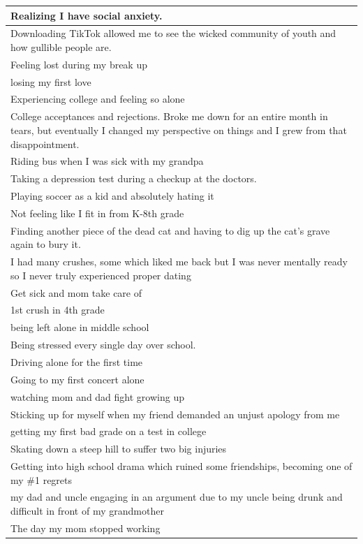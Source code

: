 \documentclass[
  .7em,
  letterpaper,
  DIV=11,
  numbers=noendperiod]{scrartcl}
\begin{document}
\begin{table}
\begin{tabular}{l}
\hline
Realizing I have social anxiety.\\
\hline
Downloading TikTok allowed me to see the wicked community of youth and how gullible people are.\\
\hline
Feeling lost during my break up\\
\hline
losing my first love\\
\hline
Experiencing college and feeling so alone\\
\hline
College acceptances and rejections. Broke me down for an entire month in tears, but eventually I changed my perspective on things and I grew from that disappointment.\\
\hline
Riding bus when I was sick with my grandpa\\
\hline
Taking a depression test during a checkup at the doctors.\\
\hline
Playing soccer as a kid and absolutely hating it\\
\hline
Not feeling like I fit in from K-8th grade\\
\hline
Finding another piece of the dead cat and having to dig up the cat's grave again to bury it.\\
\hline
I had many crushes, some which liked me back but I was never mentally ready so I never truly experienced proper dating\\
\hline
Get sick and mom take care of\\
\hline
1st crush in 4th grade\\
\hline
being left alone in middle school\\
\hline
Being stressed every single day over school.\\
\hline
Driving alone for the first time\\
\hline
Going to my first concert alone\\
\hline
watching mom and dad fight growing up\\
\hline
Sticking up for myself when my friend demanded an unjust apology from me\\
\hline
getting my first bad grade on a test in college\\
\hline
Skating down a steep hill to suffer two big injuries\\
\hline
Getting into high school drama which ruined some friendships, becoming one of my \#1 regrets\\
\hline
my dad and uncle engaging in an argument due to my uncle being drunk and difficult in front of my grandmother\\
\hline
The day my mom stopped working\\

\end{tabular}
\end{table}
\end{document}
